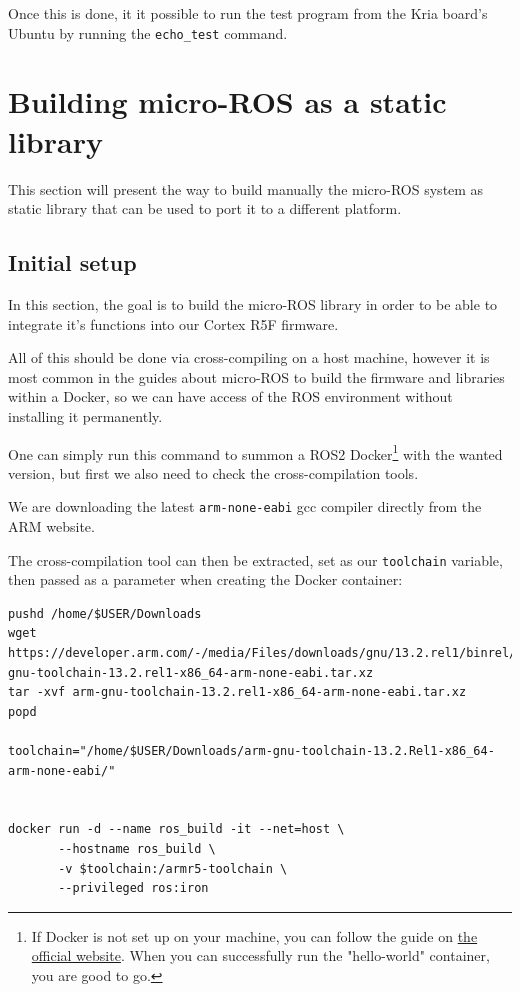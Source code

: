\documentclass[10pt]{article}
\begin{document}
Once this is done, it it possible to run the test program from the Kria board's Ubuntu
by running the \texttt{echo\_test} command.

\clearpage
\section{Building micro-ROS as a static library}
\label{sec:org70e6360}
This section will present the way to build manually the micro-ROS system as static library
that can be used to port it to a different platform.

\subsection{Initial setup}
\label{sec:org4d2abba}
In this section, the goal is to build the micro-ROS library in order to be
able to integrate it's functions into our Cortex R5F firmware.

All of this should be done via cross-compiling on a host machine, however
it is most common in the guides about micro-ROS to build the firmware and libraries within a Docker,
so we can have access of the ROS environment without installing it permanently.

One can simply run this command to summon a ROS2 Docker\footnote{If Docker is not set up on your machine, you can follow the guide on \href{https://docs.docker.com/engine/install/ubuntu/}{the official website}.
When you can successfully run the "hello-world" container, you are good to go.} with the wanted version,
but first we also need to check the cross-compilation tools.

We are downloading the latest \texttt{arm-none-eabi} gcc compiler directly from the ARM website.

The cross-compilation tool can then be extracted, set as our \texttt{toolchain} variable,
then passed as a parameter when creating the Docker container:
\begin{verbatim}
pushd /home/$USER/Downloads
wget https://developer.arm.com/-/media/Files/downloads/gnu/13.2.rel1/binrel/arm-gnu-toolchain-13.2.rel1-x86_64-arm-none-eabi.tar.xz
tar -xvf arm-gnu-toolchain-13.2.rel1-x86_64-arm-none-eabi.tar.xz
popd

toolchain="/home/$USER/Downloads/arm-gnu-toolchain-13.2.Rel1-x86_64-arm-none-eabi/"


docker run -d --name ros_build -it --net=host \
       --hostname ros_build \
       -v $toolchain:/armr5-toolchain \
       --privileged ros:iron
\end{verbatim}
\end{document}

